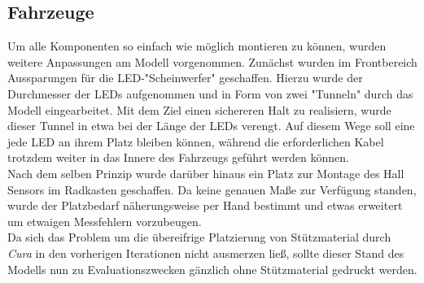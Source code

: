 \documentclass[.../Dokumentation.tex]{subfiles}
\begin{document}
\subsection{Fahrzeuge}\label{sec-ita3-cars}
Um alle Komponenten so einfach wie möglich montieren zu können, wurden 
weitere Anpassungen am Modell vorgenommen. 
Zunächst wurden im Frontbereich Aussparungen für die LED-"Scheinwerfer" 
geschaffen. Hierzu wurde der Durchmesser der LEDs aufgenommen und in Form von 
zwei "Tunneln" durch das Modell eingearbeitet. Mit dem Ziel einen sichereren 
Halt zu realisiern, wurde dieser Tunnel in etwa bei der Länge der LEDs 
verengt. Auf diesem Wege soll eine jede LED an ihrem Platz bleiben können, 
während die erforderlichen Kabel trotzdem weiter in das Innere des Fahrzeugs 
geführt werden können.\\
Nach dem selben Prinzip wurde darüber hinaus ein Platz zur Montage des Hall 
Sensors im Radkasten geschaffen. Da keine genauen Maße zur Verfügung standen, 
wurde der Platzbedarf näherungsweise per Hand bestimmt und etwas erweitert um 
etwaigen Messfehlern vorzubeugen.\\
Da sich das Problem um die übereifrige Platzierung von Stützmaterial durch 
\textit{Cura} in den vorherigen Iterationen nicht ausmerzen ließ, sollte 
dieser Stand des Modells nun zu Evaluationszwecken gänzlich ohne Stützmaterial 
gedruckt werden.
\end{document}
